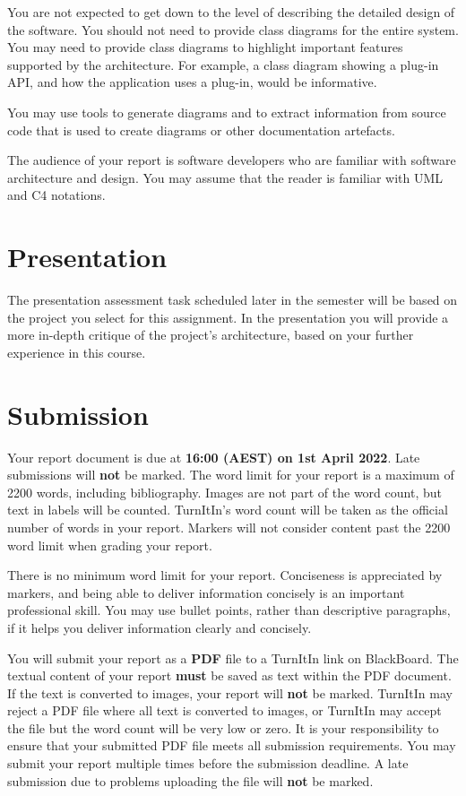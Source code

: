 \documentclass{csse4400}
\begin{document}
You are not expected to get down to the level of describing the detailed design of the software.
You should not need to provide class diagrams for the entire system.
You may need to provide class diagrams to highlight important features supported by the architecture.
For example, a class diagram showing a plug-in API, and how the application uses a plug-in, would be informative.

You may use tools to generate diagrams and to extract information from source code that is used to create diagrams or other documentation artefacts.

The audience of your report is software developers who are familiar with software architecture and design.
You may assume that the reader is familiar with UML and C4 notations.


\section{Presentation}
The presentation assessment task scheduled later in the semester will be based on the project you select for this assignment.
In the presentation you will provide a more in-depth critique of the project's architecture, based on your further experience in this course.


\section{Submission}
Your report document is due at \textbf{16:00 (AEST) on 1st April 2022}. Late submissions will \textbf{not} be marked.
The word limit for your report is a maximum of 2200 words, including bibliography.
Images are not part of the word count, but text in labels will be counted.
TurnItIn's word count will be taken as the official number of words in your report.
Markers will not consider content past the 2200 word limit when grading your report.

There is no minimum word limit for your report.
Conciseness is appreciated by markers, and being able to deliver information concisely is an important professional skill.
You may use bullet points, rather than descriptive paragraphs, if it helps you deliver information clearly and concisely.

You will submit your report as a \textbf{PDF} file to a TurnItIn link on BlackBoard.
The textual content of your report \textbf{must} be saved as text within the PDF document.
If the text is converted to images, your report will \textbf{not} be marked.
TurnItIn may reject a PDF file where all text is converted to images, or
TurnItIn may accept the file but the word count will be very low or zero.
It is your responsibility to ensure that your submitted PDF file meets all submission requirements.
You may submit your report multiple times before the submission deadline.
A late submission due to problems uploading the file will \textbf{not} be marked.
\end{document}
